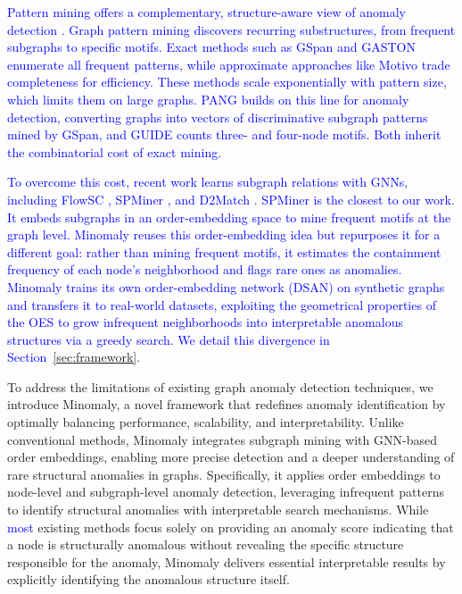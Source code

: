 \documentclass[preprint,12pt]{elsarticle}
\newcommand{\new}[1]{\textcolor{blue}{#1}}
\theoremstyle{plain}
\theoremstyle{definition}
\theoremstyle{remark}
\begin{document}
\new{Pattern mining offers a complementary, structure-aware view of anomaly detection \cite{potin2023pattern,yuan2024higherorder}. Graph pattern mining discovers recurring substructures, from frequent subgraphs to specific motifs. Exact methods such as GSpan \cite{yan2002gspan} and GASTON \cite{nijssen2005gaston} enumerate all frequent patterns, while approximate approaches like Motivo \cite{bressan2021faster} trade completeness for efficiency. These methods scale exponentially with pattern size, which limits them on large graphs. PANG \cite{potin2023pattern} builds on this line for anomaly detection, converting graphs into vectors of discriminative subgraph patterns mined by GSpan, and GUIDE \cite{yuan2024higherorder} counts three- and four-node motifs. Both inherit the combinatorial cost of exact mining.}

\new{To overcome this cost, recent work learns subgraph relations with GNNs, including FlowSC \cite{guo2025efficient}, SPMiner \cite{ying2024representation}, and D2Match \cite{liu2023d2match}. SPMiner is the closest to our work. It embeds subgraphs in an order-embedding space \cite{mcfee2009partial,vendrov2016orderembeddings} to mine frequent motifs at the graph level. Minomaly reuses this order-embedding idea but repurposes it for a different goal: rather than mining frequent motifs, it estimates the containment frequency of each node's neighborhood and flags rare ones as anomalies. Minomaly trains its own order-embedding network (DSAN) on synthetic graphs and transfers it to real-world datasets, exploiting the geometrical properties of the OES to grow infrequent neighborhoods into interpretable anomalous structures via a greedy search. We detail this divergence in Section~\ref{sec:framework}.}

To address the limitations of existing graph anomaly detection techniques, we introduce Minomaly, a novel framework that redefines anomaly identification by optimally balancing performance, scalability, and interpretability. Unlike conventional methods, Minomaly integrates subgraph mining with GNN-based order embeddings, enabling more precise detection and a deeper understanding of rare structural anomalies in graphs. Specifically, it applies order embeddings to node-level and subgraph-level anomaly detection, leveraging infrequent patterns to identify structural anomalies with interpretable search mechanisms. While \new{most} existing methods focus solely on providing an anomaly score indicating that a node is structurally anomalous without revealing the specific structure responsible for the anomaly, Minomaly delivers essential interpretable results by explicitly identifying the anomalous structure itself.
\end{document}
